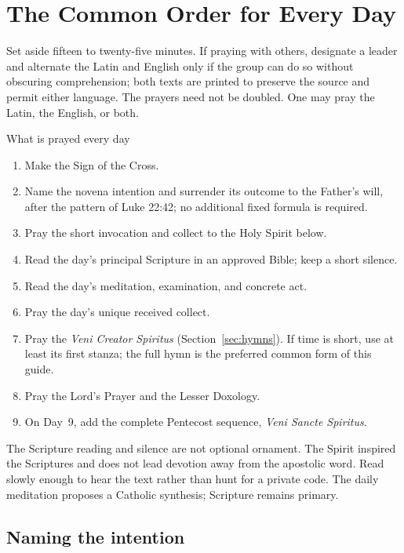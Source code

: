 \section{The Common Order for Every Day}

Set aside fifteen to twenty-five minutes. If praying with others, designate a leader and alternate the Latin and English only if the group can do so without obscuring comprehension; both texts are printed to preserve the source and permit either language. The prayers need not be doubled. One may pray the Latin, the English, or both.

\begin{studybox}{What is prayed every day}
\begin{enumerate}
\item Make the Sign of the Cross.
\item Name the novena intention and surrender its outcome to the Father's will, after the pattern of Luke 22:42; no additional fixed formula is required.
\item Pray the short invocation and collect to the Holy Spirit below.
\item Read the day's principal Scripture in an approved Bible; keep a short silence.
\item Read the day's meditation, examination, and concrete act.
\item Pray the day's unique received collect.
\item Pray the \textit{Veni Creator Spiritus} (Section~\ref{sec:hymns}). If time is short, use at least its first stanza; the full hymn is the preferred common form of this guide.
\item Pray the Lord's Prayer and the Lesser Doxology.
\item On Day~9, add the complete Pentecost sequence, \textit{Veni Sancte Spiritus}.
\end{enumerate}
\end{studybox}

The Scripture reading and silence are not optional ornament. The Spirit inspired the Scriptures and does not lead devotion away from the apostolic word. Read slowly enough to hear the text rather than hunt for a private code. The daily meditation proposes a Catholic synthesis; Scripture remains primary.

\NovenaSignOfCross



\subsection{Naming the intention}

